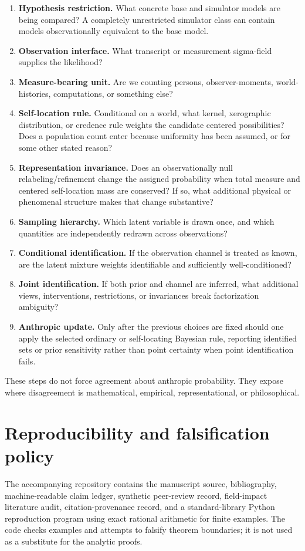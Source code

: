 \documentclass[11pt]{article}
\begin{document}
\begin{enumerate}
\item \textbf{Hypothesis restriction.} What concrete base and simulator models are being compared? A completely unrestricted simulator class can contain models observationally equivalent to the base model.
\item \textbf{Observation interface.} What transcript or measurement sigma-field supplies the likelihood?
\item \textbf{Measure-bearing unit.} Are we counting persons, observer-moments, world-histories, computations, or something else?
\item \textbf{Self-location rule.} Conditional on a world, what kernel, xerographic distribution, or credence rule weights the candidate centered possibilities? Does a population count enter because uniformity has been assumed, or for some other stated reason?
\item \textbf{Representation invariance.} Does an observationally null relabeling/refinement change the assigned probability when total measure and centered self-location mass are conserved? If so, what additional physical or phenomenal structure makes that change substantive?
\item \textbf{Sampling hierarchy.} Which latent variable is drawn once, and which quantities are independently redrawn across observations?
\item \textbf{Conditional identification.} If the observation channel is treated as known, are the latent mixture weights identifiable and sufficiently well-conditioned?
\item \textbf{Joint identification.} If both prior and channel are inferred, what additional views, interventions, restrictions, or invariances break factorization ambiguity?
\item \textbf{Anthropic update.} Only after the previous choices are fixed should one apply the selected ordinary or self-locating Bayesian rule, reporting identified sets or prior sensitivity rather than point certainty when point identification fails.
\end{enumerate}

These steps do not force agreement about anthropic probability. They expose where disagreement is mathematical, empirical, representational, or philosophical.

\section{Reproducibility and falsification policy}
The accompanying repository contains the manuscript source, bibliography, machine-readable claim ledger, synthetic peer-review record, field-impact literature audit, citation-provenance record, and a standard-library Python reproduction program using exact rational arithmetic for finite examples. The code checks examples and attempts to falsify theorem boundaries; it is not used as a substitute for the analytic proofs.
\end{document}
